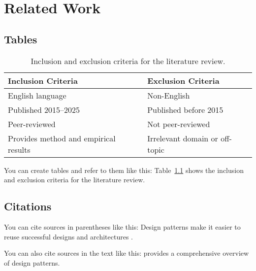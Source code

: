 \chapter{Related Work}
\label{chap:related-work}

\section{Tables}

\begin{table}[htbp]
    \centering
    \caption{Inclusion and exclusion criteria for the literature review.}
    \label{table:review-criteria}
    \begin{tabularx}{1.0\textwidth}{>{\raggedright\arraybackslash}X>{\raggedright\arraybackslash}X}
        \toprule
        \textbf{Inclusion Criteria}             & \textbf{Exclusion Criteria}       \\
        \midrule
        English language                        & Non-English                       \\
        Published 2015–2025                     & Published before 2015             \\
        Peer-reviewed                           & Not peer-reviewed                 \\
        Provides method and empirical results   & Irrelevant domain or off-topic    \\
        \bottomrule  
    \end{tabularx}
\end{table}

You can create tables and refer to them like this: Table~\ref{table:review-criteria} shows the inclusion and exclusion criteria for the literature review.

\section{Citations}

You can cite sources in parentheses like this: Design patterns make it easier to reuse successful designs and architectures \autocite{gamma1994design}.

You can also cite sources in the text like this: \textcite{gamma1994design} provides a comprehensive overview of design patterns.
